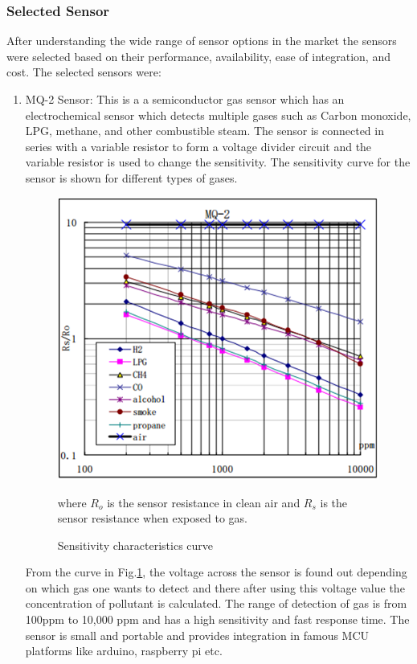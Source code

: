 \documentclass[12pt,a4paper,oneside]{report}
\begin{document}
 \subsubsection*{Selected Sensor}

 After understanding the wide range of sensor options in the market the sensors were selected based on their performance, availability, ease of integration, and cost. The selected sensors were:
 \begin{enumerate}

  \item MQ-2 Sensor: This is a a semiconductor gas sensor which has an electrochemical sensor which detects multiple gases such as Carbon monoxide, LPG, methane, and other combustible steam. The sensor is connected in series with a variable resistor to form a voltage divider circuit and the variable resistor is used to change the sensitivity. The sensitivity curve for the sensor is shown for different types of gases.
\par
\begin{figure}[h]
  \begin{center}
  \includegraphics[scale=0.40]{images/figure1.png}
  \end{center}
  \caption{Sensitivity characteristics curve \cite{Data2012}}
  \label{curve}

  where $R_{o}$ is the sensor resistance in clean air and $R_{s}$ is the sensor resistance when exposed to gas.
\end{figure}
From the curve in Fig.\ref{curve}, the voltage across the sensor is found out depending on which gas one wants to detect and there after using this voltage value the concentration of pollutant is calculated. The range of detection of gas is from 100ppm to 10,000 ppm and has a high sensitivity and fast response time. The sensor is small and portable and provides integration in famous MCU platforms like arduino, raspberry pi etc. 


\end{enumerate}
\end{document}
